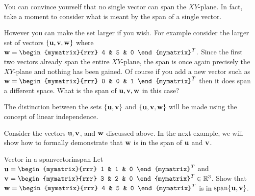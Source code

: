 You can convince yourself that no single vector can span the
$XY$-plane. In fact, take a moment to consider what is meant by the span of a single vector.

However you can make the set larger if you wish. For example consider
the larger set of vectors $\{{\bf u}, {\bf v},
{\bf w}\}$ where $ \vect{w}=\begin{mymatrix}{rrr}
4 & 5 & 0
\end{mymatrix}^T$. 
Since
the first two vectors already span the entire $XY$-plane, the span is
once again precisely the $XY$-plane and nothing has been gained. Of
course if you add a new vector such as
$ \vect{w}=\begin{mymatrix}{rrr}
0 & 0 & 1
\end{mymatrix}^T$ then it does span a different space. What is the span of ${\bf u}, {\bf v}, {\bf w}$ in this case?   

The distinction between the sets $\{{\bf u}, {\bf v}\}$ and $\{
{\bf u}, {\bf v}, {\bf w}\}$ will be made using the concept of linear independence. 

Consider the vectors ${\bf u}, {\bf v}$, and ${\bf w}$ discussed above. In the next example, we will show how to formally demonstrate that ${\bf w}$ is in the span of ${\bf u}$ and ${\bf v}$. 

\begin{example}{Vector in a span}{vectorinspan}
Let $\vect{u}=\begin{mymatrix}{rrr}
1  & 1 & 0
\end{mymatrix}^T$ and
$\vect{v}=\begin{mymatrix}{rrr}
3  & 2 & 0
\end{mymatrix}^T \in \R^{3}$. Show that $\vect{w} = \begin{mymatrix}{rrr}
4 & 5 & 0 
\end{mymatrix}^{T}$ is in $\mbox{span} \{{\bf u}, {\bf v} \}$.
\end{example}

